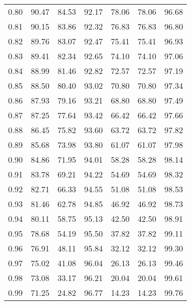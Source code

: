 \begin{tabular}{|c|c|c|c|c|c|c|}
      0.80 &     90.47 &     84.53 &      92.17 &   78.06 &      78.06 &         96.68 \\
      0.81 &     90.15 &     83.86 &      92.32 &   76.83 &      76.83 &         96.80 \\
      0.82 &     89.76 &     83.07 &      92.47 &   75.41 &      75.41 &         96.93 \\
      0.83 &     89.41 &     82.34 &      92.65 &   74.10 &      74.10 &         97.06 \\
      0.84 &     88.99 &     81.46 &      92.82 &   72.57 &      72.57 &         97.19 \\
      0.85 &     88.50 &     80.40 &      93.02 &   70.80 &      70.80 &         97.34 \\
      0.86 &     87.93 &     79.16 &      93.21 &   68.80 &      68.80 &         97.49 \\
      0.87 &     87.25 &     77.64 &      93.42 &   66.42 &      66.42 &         97.66 \\
      0.88 &     86.45 &     75.82 &      93.60 &   63.72 &      63.72 &         97.82 \\
      0.89 &     85.68 &     73.98 &      93.80 &   61.07 &      61.07 &         97.98 \\
      0.90 &     84.86 &     71.95 &      94.01 &   58.28 &      58.28 &         98.14 \\
      0.91 &     83.78 &     69.21 &      94.22 &   54.69 &      54.69 &         98.32 \\
      0.92 &     82.71 &     66.33 &      94.55 &   51.08 &      51.08 &         98.53 \\
      0.93 &     81.46 &     62.78 &      94.85 &   46.92 &      46.92 &         98.73 \\
      0.94 &     80.11 &     58.75 &      95.13 &   42.50 &      42.50 &         98.91 \\
      0.95 &     78.68 &     54.19 &      95.50 &   37.82 &      37.82 &         99.11 \\
      0.96 &     76.91 &     48.11 &      95.84 &   32.12 &      32.12 &         99.30 \\
      0.97 &     75.02 &     41.08 &      96.04 &   26.13 &      26.13 &         99.46 \\
      0.98 &     73.08 &     33.17 &      96.21 &   20.04 &      20.04 &         99.61 \\
      0.99 &     71.25 &     24.82 &      96.77 &   14.23 &      14.23 &         99.76 \\
\bottomrule
\end{tabular}
